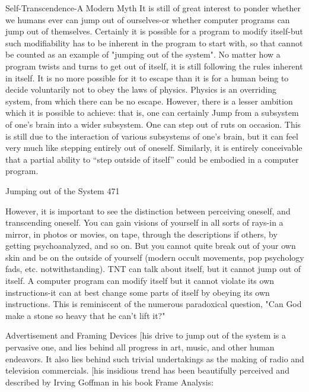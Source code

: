 {                       Self-Transcendence-A Modern Myth
It is still of great interest to ponder whether we humans ever can jump out of ourselves-or
whether computer programs can jump out of themselves. Certainly it is possible for a
program to modify itself-but such modifiability has to be inherent in the program to start
with, so that cannot be counted as an example of "jumping out of the system". No matter
how a program twists and turns to get out of itself, it is still following the rules inherent
in itself. It is no more possible for it to escape than it is for a human being to decide
voluntarily not to obey the laws of physics. Physics is an overriding system, from which
there can be no escape. However, there is a lesser ambition which it is possible to
achieve: that is, one can certainly Jump from a subsystem of one's brain into a wider
subsystem. One can step out of ruts on occasion. This is still due to the interaction of
various subsystems of one’s brain, but it can feel very much like stepping entirely out of
oneself. Similarly, it is entirely conceivable that a partial ability to “step outside of itself”
could be embodied in a computer program.




Jumping out of the System                                                                   471

        However, it is important to see the distinction between perceiving oneself, and
transcending oneself. You can gain visions of yourself in all sorts of rays-in a mirror, in
photos or movies, on tape, through the descriptions if others, by getting psychoanalyzed,
and so on. But you cannot quite break out of your own skin and be on the outside of
yourself (modern occult movements, pop psychology fads, etc. notwithstanding). TNT
can talk about itself, but it cannot jump out of itself. A computer program can modify
itself but it cannot violate its own instructions-it can at best change some parts of itself by
obeying its own instructions. This is reminiscent of the numerous paradoxical question,
"Can God make a stone so heavy that he can’t lift it?"

                       Advertisement and Framing Devices
[his drive to jump out of the system is a pervasive one, and lies behind all progress in art,
music, and other human endeavors. It also lies behind such trivial undertakings as the
making of radio and television commercials. [his insidious trend has been beautifully
perceived and described by Irving Goffman in his book Frame Analysis:

}
